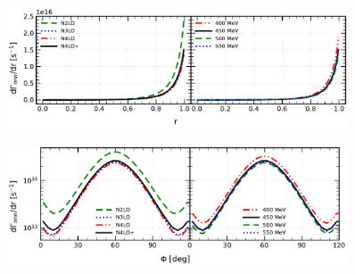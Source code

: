    \begin{figure}[h]
        \begin{center}
        \includegraphics[width=0.9\textwidth]{PlotData/PION/Dalitz_maps/figures/3H_dGdr.pdf}
        \end{center}
        \caption{}
        \label{pion_dGdr_3H}
    \end{figure}


    \begin{figure}[h]
        \begin{center}
        \includegraphics[width=0.9\textwidth]{PlotData/PION/Dalitz_maps/figures/3H_dGdphi.pdf}
        \end{center}
        \caption{}
        \label{pion_dGdphi_3H}
    \end{figure}
